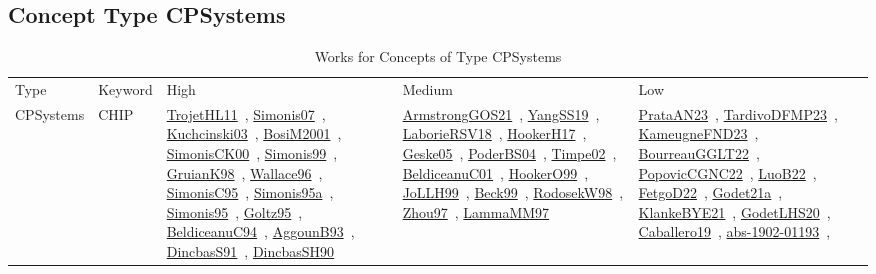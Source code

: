 \clearpage
\subsection{Concept Type CPSystems}
\label{sec:CPSystems}
{\scriptsize
\begin{longtable}{lp{3cm}>{\raggedright\arraybackslash}p{6cm}>{\raggedright\arraybackslash}p{6cm}>{\raggedright\arraybackslash}p{8cm}}
\rowcolor{white}\caption{Works for Concepts of Type CPSystems}\\ \toprule
\rowcolor{white}Type & Keyword & High & Medium & Low\\ \midrule\endhead
\bottomrule
\endfoot
CPSystems & CHIP & \href{../works/TrojetHL11.pdf}{TrojetHL11}~\cite{TrojetHL11}, \href{../works/Simonis07.pdf}{Simonis07}~\cite{Simonis07}, \href{../works/Kuchcinski03.pdf}{Kuchcinski03}~\cite{Kuchcinski03}, \href{../works/BosiM2001.pdf}{BosiM2001}~\cite{BosiM2001}, \href{../works/SimonisCK00.pdf}{SimonisCK00}~\cite{SimonisCK00}, \href{../works/Simonis99.pdf}{Simonis99}~\cite{Simonis99}, \href{../works/GruianK98.pdf}{GruianK98}~\cite{GruianK98}, \href{../works/Wallace96.pdf}{Wallace96}~\cite{Wallace96}, \href{../works/SimonisC95.pdf}{SimonisC95}~\cite{SimonisC95}, \href{../works/Simonis95a.pdf}{Simonis95a}~\cite{Simonis95a}, \href{../works/Simonis95.pdf}{Simonis95}~\cite{Simonis95}, \href{../works/Goltz95.pdf}{Goltz95}~\cite{Goltz95}, \href{../works/BeldiceanuC94.pdf}{BeldiceanuC94}~\cite{BeldiceanuC94}, \href{../works/AggounB93.pdf}{AggounB93}~\cite{AggounB93}, \href{../works/DincbasS91.pdf}{DincbasS91}~\cite{DincbasS91}, \href{../works/DincbasSH90.pdf}{DincbasSH90}~\cite{DincbasSH90} & \href{../works/ArmstrongGOS21.pdf}{ArmstrongGOS21}~\cite{ArmstrongGOS21}, \href{../works/YangSS19.pdf}{YangSS19}~\cite{YangSS19}, \href{../works/LaborieRSV18.pdf}{LaborieRSV18}~\cite{LaborieRSV18}, \href{../works/HookerH17.pdf}{HookerH17}~\cite{HookerH17}, \href{../works/Geske05.pdf}{Geske05}~\cite{Geske05}, \href{../works/PoderBS04.pdf}{PoderBS04}~\cite{PoderBS04}, \href{../works/Timpe02.pdf}{Timpe02}~\cite{Timpe02}, \href{../works/BeldiceanuC01.pdf}{BeldiceanuC01}~\cite{BeldiceanuC01}, \href{../works/HookerO99.pdf}{HookerO99}~\cite{HookerO99}, \href{../works/JoLLH99.pdf}{JoLLH99}~\cite{JoLLH99}, \href{../works/Beck99.pdf}{Beck99}~\cite{Beck99}, \href{../works/RodosekW98.pdf}{RodosekW98}~\cite{RodosekW98}, \href{../works/Zhou97.pdf}{Zhou97}~\cite{Zhou97}, \href{../works/LammaMM97.pdf}{LammaMM97}~\cite{LammaMM97} & \href{../works/PrataAN23.pdf}{PrataAN23}~\cite{PrataAN23}, \href{../works/TardivoDFMP23.pdf}{TardivoDFMP23}~\cite{TardivoDFMP23}, \href{../works/KameugneFND23.pdf}{KameugneFND23}~\cite{KameugneFND23}, \href{../works/BourreauGGLT22.pdf}{BourreauGGLT22}~\cite{BourreauGGLT22}, \href{../works/PopovicCGNC22.pdf}{PopovicCGNC22}~\cite{PopovicCGNC22}, \href{../works/LuoB22.pdf}{LuoB22}~\cite{LuoB22}, \href{../works/FetgoD22.pdf}{FetgoD22}~\cite{FetgoD22}, \href{../works/Godet21a.pdf}{Godet21a}~\cite{Godet21a}, \href{../works/KlankeBYE21.pdf}{KlankeBYE21}~\cite{KlankeBYE21}, \href{../works/GodetLHS20.pdf}{GodetLHS20}~\cite{GodetLHS20}, \href{../works/Caballero19.pdf}{Caballero19}~\cite{Caballero19}, \href{../works/abs-1902-01193.pdf}{abs-1902-01193}~\cite{abs-1902-01193}, 
\end{longtable}}

